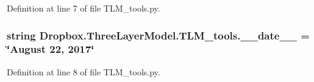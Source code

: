 Definition at line 7 of file T\+L\+M\+\_\+tools.\+py.

\hypertarget{namespaceDropbox_1_1ThreeLayerModel_1_1TLM__tools_a0aefac305a9a1c76ae8110db1a86cd18}{
\subsubsection[{\+\_\+\+\_\+date\+\_\+\+\_\+}]{\setlength{\rightskip}{0pt plus 5cm}string Dropbox.\+Three\+Layer\+Model.\+T\+L\+M\+\_\+tools.\+\_\+\+\_\+date\+\_\+\+\_\+ = \char`\"{}August 22, 2017\char`\"{}}}\label{namespaceDropbox_1_1ThreeLayerModel_1_1TLM__tools_a0aefac305a9a1c76ae8110db1a86cd18}


Definition at line 8 of file T\+L\+M\+\_\+tools.\+py.

